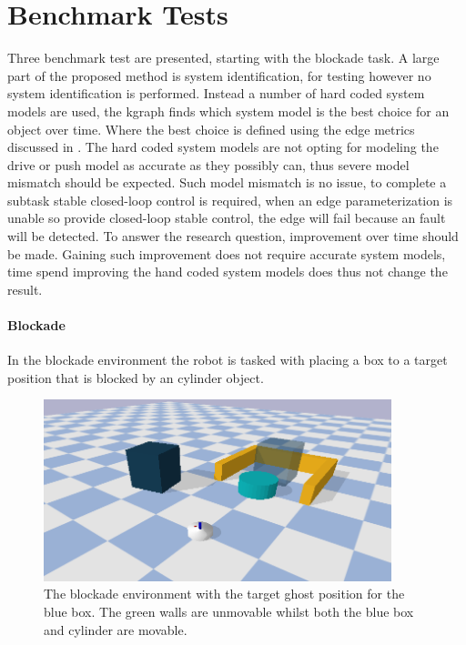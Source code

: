 \section{Benchmark Tests}%
\label{sec:benchmark_tests}
Three benchmark test are presented, starting with the blockade task. A large part of the proposed method is system identification, for testing however no system identification is performed. Instead a number of hard coded system models are used, the \ac{kgraph} finds which system model is the best choice for an object over time. Where the best choice is defined using the edge metrics discussed in . The hard coded system models are not opting for modeling the drive or push model as accurate as they possibly can, thus severe model mismatch should be expected. Such model mismatch is no issue, to complete a subtask stable closed-loop control is required, when an edge parameterization is unable so provide closed-loop stable control, the edge will fail because an fault will be detected. To answer the research question, improvement over time should be made. Gaining such improvement does not require accurate system models, time spend improving the hand coded system models does thus not change the result.\bs


\paragraph{Blockade} In the blockade environment the robot is tasked with placing a box to a target position that is blocked by an cylinder object.\bs
\begin{figure}[H]
    \centering
    \includegraphics[width=0.9\textwidth]{figures/tests/blockade}
    \caption{The blockade environment with the target ghost position for the blue box. The green walls are unmovable whilst both the blue box and cylinder are movable.}%
    \label{fig:benchmark_blockade}
\end{figure}

